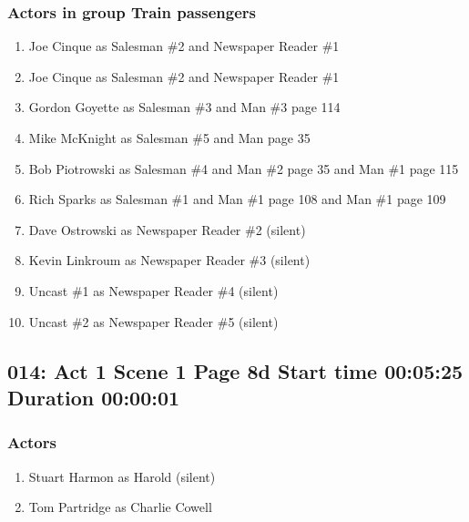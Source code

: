 \subsubsection{Actors in group Train passengers}
\begin{enumerate}
\item Joe Cinque as Salesman \#2 and Newspaper Reader \#1
\item Joe Cinque as Salesman \#2 and Newspaper Reader \#1
\item Gordon Goyette as Salesman \#3 and Man \#3 page 114
\item Mike McKnight as Salesman \#5 and Man page 35
\item Bob Piotrowski as Salesman \#4 and Man \#2 page 35 and Man \#1 page 115
\item Rich Sparks as Salesman \#1 and Man \#1 page 108 and Man \#1 page 109
\item Dave Ostrowski as Newspaper Reader \#2 (silent)
\item Kevin Linkroum as Newspaper Reader \#3 (silent)
\item Uncast \#1 as Newspaper Reader \#4 (silent)
\item Uncast \#2 as Newspaper Reader \#5 (silent)
\end{enumerate}


\subsection{014: Act 1 Scene 1 Page 8d Start time 00:05:25 Duration 00:00:01}

\subsubsection{Actors}
\begin{enumerate}
\item Stuart Harmon as Harold (silent)
\item Tom Partridge as Charlie Cowell
\end{enumerate}
